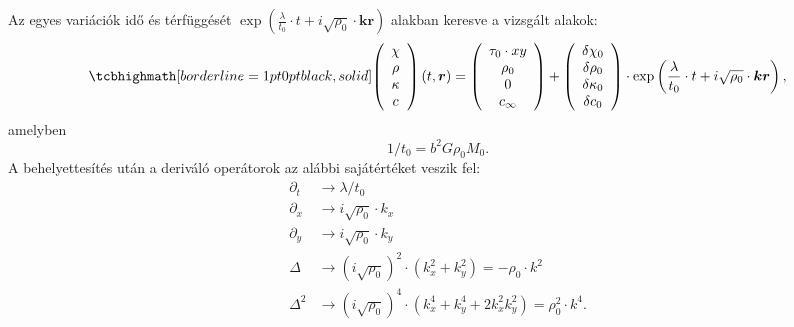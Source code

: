 \documentclass[10pt,a4paper]{scrartcl}
\let\mathbf\bm
\begin{document}
Az egyes variációk idő és térfüggését $\exp \left( {\frac{\lambda }{{{t_0}}} \cdot t + i\sqrt {{\rho _0}}  \cdot {\mathbf{kr}}} \right)$ alakban keresve a vizsgált alakok:
\begin{gather} \label{eq:perturbative_solution}
\tcbhighmath[borderline={1pt}{0pt}{black,solid}]{
\left( {\begin{array}{*{20}{c}}
  \chi  \\ 
  \rho  \\ 
  \kappa  \\ 
  c 
\end{array}} \right)\left( {t,{\mathbf{r}}} \right) = \left( {\begin{array}{*{20}{c}}
  {{\tau _0} \cdot xy} \\ 
  {{\rho _0}} \\ 
  0 \\ 
  {{c_\infty }} 
\end{array}} \right) + \left( {\begin{array}{*{20}{c}}
  {\delta {\chi _0}} \\ 
  {\delta {\rho _0}} \\ 
  {\delta {\kappa _0}} \\ 
  {\delta {c_0}} 
\end{array}} \right) \cdot \exp \left( {\frac{\lambda }{{{t_0}}} \cdot t + i\sqrt {{\rho _0}}  \cdot {\mathbf{kr}}} \right),}
\end{gather}
amelyben
\begin{equation} \label{eq:t_0_def}
1/{t_0} = {b^2}G{\rho _0}{M_0}.
\end{equation}
A behelyettesítés után a deriváló operátorok az alábbi sajátértéket veszik fel:
\[\begin{aligned}
  {\partial _t} &  \to \lambda /t_0 \\ 
  {\partial _x} &  \to i\sqrt {{\rho _0}}  \cdot {k_x} \\ 
  {\partial _y} &  \to i\sqrt {{\rho _0}}  \cdot {k_y} \\ 
  \Delta  &  \to {\left( {i\sqrt {{\rho _0}} } \right)^2} \cdot \left( {k_x^2 + k_y^2} \right) =  - {\rho _0} \cdot {k^2} \\ 
  {\Delta ^2} &  \to {\left( {i\sqrt {{\rho _0}} } \right)^4} \cdot \left( {k_x^4 + k_y^4 + 2k_x^2k_y^2} \right) = \rho _0^2 \cdot {k^4}. 
\end{aligned} \]
\end{document}
